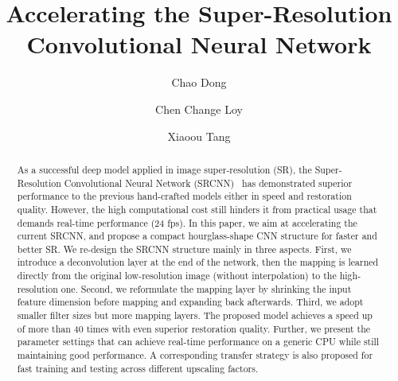 \documentclass[runningheads]{llncs}
\newcommand{\etal}{\emph{et al.}}
\begin{document}
\pagestyle{headings}
\mainmatter
\def\ECCV16SubNumber{359}  

\title{Accelerating the Super-Resolution \\Convolutional Neural Network} 


\authorrunning{Chao Dong \etal}

\author{Chao Dong \and Chen Change Loy  \and Xiaoou Tang}

\maketitle

\begin{abstract}

As a successful deep model applied in image super-resolution (SR), the Super-Resolution Convolutional Neural Network (SRCNN)~\cite{Dong2014,Dong2015} has demonstrated superior performance to the previous hand-crafted models either in speed and restoration quality. However, the high computational cost still hinders it from practical usage that demands real-time performance (24 fps). In this paper, we aim at accelerating the current SRCNN, and propose a compact hourglass-shape CNN structure for faster and better SR. We re-design the SRCNN structure mainly in three aspects. First, we introduce a deconvolution layer at the end of the network, then the mapping is learned directly from the original low-resolution image (without interpolation) to the high-resolution one. Second, we reformulate the mapping layer by shrinking the input feature dimension before mapping and expanding back afterwards. Third, we adopt smaller filter sizes but more mapping layers. The proposed model achieves a speed up of more than 40 times with even superior restoration quality. Further, we present the parameter settings that can achieve real-time performance on a generic CPU while still maintaining good performance. A corresponding transfer strategy is also proposed for fast training and testing across different upscaling factors.
\end{abstract}
\end{document}
